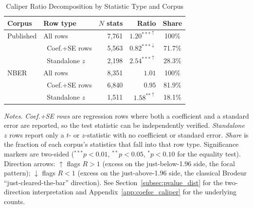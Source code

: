 \documentclass[12pt]{article}
\begin{document}
\begin{table}[H]
\centering
\caption{Caliper Ratio Decomposition by Statistic Type and Corpus}
\label{tab:stat_type_decomp}
\begin{singlespace}
\small
\begin{tabular}{llrrc}
\hline\hline
Corpus & Row type & $N$ stats & Ratio & Share \\
\hline
Published & All rows            & 7,761 & $1.20^{***\uparrow}$\phantom{$^{*}$} & 100\% \\
          & \ Coef.+SE rows     & 5,563 & $0.82^{***\downarrow}$\phantom{$^{*}$} & 71.7\% \\
          & \ Standalone $z$    & 2,198 & $2.54^{***\uparrow}$\phantom{$^{*}$} & 28.3\% \\[4pt]
NBER      & All rows            & 8,351 & $1.01$\phantom{$^{****\uparrow}$} & 100\% \\
          & \ Coef.+SE rows     & 6,840 & $0.95$\phantom{$^{****\uparrow}$} & 81.9\% \\
          & \ Standalone $z$    & 1,511 & $1.58^{**\uparrow}$\phantom{$^{**}$}  & 18.1\% \\
\hline\hline
\end{tabular}
\begin{minipage}{\textwidth}
\smallskip
\footnotesize
\textit{Notes.} \textit{Coef.+SE rows} are regression rows where both a
coefficient and a standard error are reported, so the test statistic can be
independently verified.  \textit{Standalone $z$} rows report only a $t$- or
$z$-statistic with no coefficient or standard error.  \textit{Share} is the
fraction of each corpus's statistics that fall into that row type.
Significance markers are two-sided
($^{***}p<0.01$, $^{**}p<0.05$, $^{*}p<0.10$ for the equality test).
Direction arrows: $\uparrow$ flags $R>1$ (excess on the just-below-1.96
side, the focal pattern); $\downarrow$ flags $R<1$ (excess on the
just-above-1.96 side, the classical Brodeur ``just-cleared-the-bar''
direction).  See Section~\ref{subsec:pvalue_dist} for the two-direction
interpretation and Appendix~\ref{app:coefse_caliper} for the underlying
counts.
\end{minipage}
\end{singlespace}
\end{table}
\end{document}
